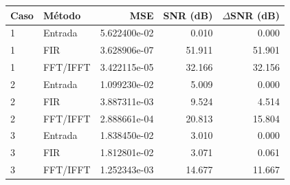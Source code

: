 \begin{tabular}{llrrr}\toprule
Caso & Método & MSE & SNR (dB) & $\Delta$SNR (dB)\\\midrule
1 & Entrada & 5.622400e-02 & 0.010 & 0.000\\
1 & FIR & 3.628906e-07 & 51.911 & 51.901\\
1 & FFT/IFFT & 3.422115e-05 & 32.166 & 32.156\\
2 & Entrada & 1.099230e-02 & 5.009 & 0.000\\
2 & FIR & 3.887311e-03 & 9.524 & 4.514\\
2 & FFT/IFFT & 2.888661e-04 & 20.813 & 15.804\\
3 & Entrada & 1.838450e-02 & 3.010 & 0.000\\
3 & FIR & 1.812801e-02 & 3.071 & 0.061\\
3 & FFT/IFFT & 1.252343e-03 & 14.677 & 11.667\\
\bottomrule\end{tabular}
